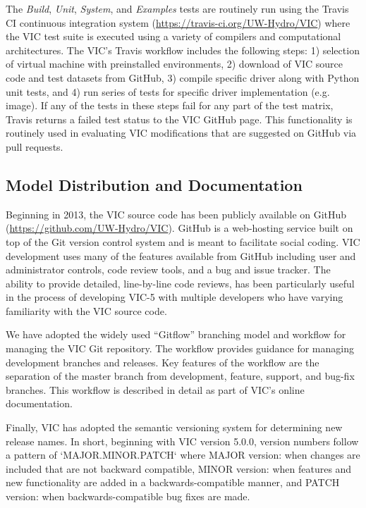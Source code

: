 \documentclass[gmd, manuscript]{copernicus}
\begin{document}
    The \textit{Build}, \textit{Unit}, \textit{System}, and \textit{Examples} tests are routinely run using the Travis CI continuous integration system (\url{https://travis-ci.org/UW-Hydro/VIC}) where the VIC test suite is executed using a variety of compilers and computational architectures. The VIC's Travis workflow includes the following steps: 1) selection of virtual machine with preinstalled environments, 2) download of VIC source code and test datasets from GitHub, 3) compile specific driver along with Python unit tests, and 4) run series of tests for specific driver implementation (e.g. image). If any of the tests in these steps fail for any part of the test matrix, Travis returns a failed test status to the VIC GitHub page. This functionality is routinely used in evaluating VIC modifications that are suggested on GitHub via pull requests.

  \subsection{Model Distribution and Documentation}

    Beginning in 2013, the VIC source code has been publicly available on GitHub (\url{https://github.com/UW-Hydro/VIC}). GitHub is a web-hosting service built on top of the Git version control system and is meant to facilitate social coding. VIC development uses many of the features available from GitHub including user and administrator controls, code review tools, and a bug and issue tracker. The ability to provide detailed, line-by-line code reviews, has been particularly useful in the process of developing VIC-5 with multiple developers who have varying familiarity with the VIC source code.

    We have adopted the widely used ``Gitflow'' branching model and workflow for managing the VIC Git repository. The workflow provides guidance for managing development branches and releases. Key features of the workflow are the separation of the master branch from development, feature, support, and bug-fix branches. This workflow is described in detail as part of VIC's online documentation.

    Finally, VIC has adopted the semantic versioning system \citep{Preston-Werner_2018} for determining new release names. In short, beginning with VIC version 5.0.0, version numbers follow a pattern of `MAJOR.MINOR.PATCH` where MAJOR version: when changes are included that are not backward compatible, MINOR version: when features and new functionality are added in a backwards-compatible manner, and PATCH version: when backwards-compatible bug fixes are made.
\end{document}
